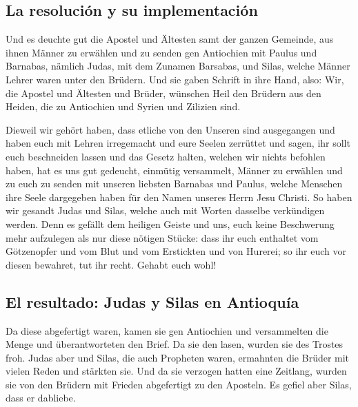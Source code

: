 \hypertarget{la-resoluciuxf3n-y-su-implementaciuxf3n}{%
\subsection{La resolución y su
implementación}\label{la-resoluciuxf3n-y-su-implementaciuxf3n}}

 Und es deuchte gut die Apostel und Ältesten samt der
ganzen Gemeinde, aus ihnen Männer zu erwählen und zu senden gen
Antiochien mit Paulus und Barnabas, nämlich Judas, mit dem Zunamen
Barsabas, und Silas, welche Männer Lehrer waren unter den Brüdern.
 Und sie gaben Schrift in ihre Hand, also: Wir, die
Apostel und Ältesten und Brüder, wünschen Heil den Brüdern aus den
Heiden, die zu Antiochien und Syrien und Zilizien sind.

 Dieweil wir gehört haben, dass etliche von den Unseren
sind ausgegangen und haben euch mit Lehren irregemacht und eure Seelen
zerrüttet und sagen, ihr sollt euch beschneiden lassen und das Gesetz
halten, welchen wir nichts befohlen haben,  hat es uns
gut gedeucht, einmütig versammelt, Männer zu erwählen und zu euch zu
senden mit unseren liebsten Barnabas und Paulus,  welche
Menschen ihre Seele dargegeben haben für den Namen unseres Herrn Jesu
Christi.  So haben wir gesandt Judas und Silas, welche
auch mit Worten dasselbe verkündigen werden.  Denn es
gefällt dem heiligen Geiste und uns, euch keine Beschwerung mehr
aufzulegen als nur diese nötigen Stücke:  dass ihr euch
enthaltet vom Götzenopfer und vom Blut und vom Erstickten und von
Hurerei; so ihr euch vor diesen bewahret, tut ihr recht. Gehabt euch
wohl!

\hypertarget{el-resultado-judas-y-silas-en-antioquuxeda}{%
\subsection{El resultado: Judas y Silas en
Antioquía}\label{el-resultado-judas-y-silas-en-antioquuxeda}}

 Da diese abgefertigt waren, kamen sie gen Antiochien und
versammelten die Menge und überantworteten den Brief.  Da
sie den lasen, wurden sie des Trostes froh.  Judas aber
und Silas, die auch Propheten waren, ermahnten die Brüder mit vielen
Reden und stärkten sie.  Und da sie verzogen hatten eine
Zeitlang, wurden sie von den Brüdern mit Frieden abgefertigt zu den
Aposteln.  Es gefiel aber Silas, dass er dabliebe.

